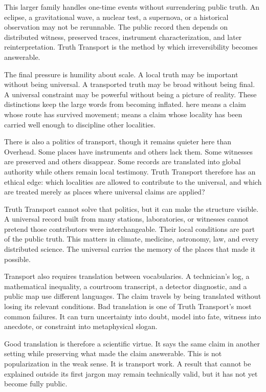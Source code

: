 \begin{chapteressay}
This larger family handles one-time events without surrendering public truth.
An eclipse, a gravitational wave, a nuclear test, a supernova, or a historical
observation may not be rerunnable. The public record then depends on
distributed witness, preserved traces, instrument characterization, and later
reinterpretation. Truth Transport is the method by which irreversibility
becomes answerable.

The final pressure is humility about scale. A local truth may be important
without being universal. A transported truth may be broad without being
final. A universal constraint may be powerful without being a picture of
reality. These distinctions keep the large words from becoming inflated.
 here means a claim whose route has survived movement;
 means a claim whose locality has been carried well enough
to discipline other localities.

There is also a politics of transport, though it remains quieter here than
Overhead. Some places have instruments and others lack them. Some witnesses
are preserved and others disappear. Some records are translated into global
authority while others remain local testimony. Truth Transport therefore has
an ethical edge: which localities are allowed to contribute to the universal,
and which are treated merely as places where universal claims are applied?

Truth Transport cannot solve that politics, but it can make the structure
visible. A universal record built from many stations, laboratories, or
witnesses cannot pretend those contributors were interchangeable. Their
local conditions are part of the public truth. This matters in climate,
medicine, astronomy, law, and every distributed science. The universal
carries the memory of the places that made it possible.

Transport also requires translation between vocabularies. A technician's log,
a mathematical inequality, a courtroom transcript, a detector diagnostic, and
a public map use different languages. The claim travels by being translated
without losing its relevant conditions. Bad translation is one of Truth
Transport's most common failures. It can turn uncertainty into doubt, model
into fate, witness into anecdote, or constraint into metaphysical slogan.

Good translation is therefore a scientific virtue. It says the same claim in
another setting while preserving what made the claim answerable. This is not
popularization in the weak sense. It is transport work. A result that cannot
be explained outside its first jargon may remain technically valid, but it
has not yet become fully public.


\end{chapteressay}
